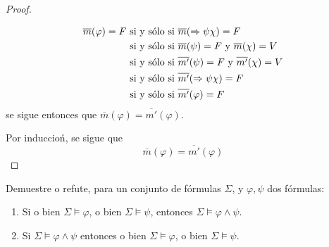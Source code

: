 \documentclass[12pt]{report}
\theoremstyle{largebreak}
\begin{document}
\begin{proof}
\begin{itemize}
\begin{itemize}
                \begin{equation*}
                    \begin{split}
                        \overline{m}(\varphi)=F&\textup{ si y sólo si }\overline{m}(\Rightarrow\psi\chi)=F\\
                        &\textup{ si y sólo si }\overline{m}(\psi)=F\textup{ y }\overline{m}(\chi)=V\\
                        &\textup{ si y sólo si }\overline{m'}(\psi)=F\textup{ y }\overline{m'}(\chi)=V\\
                        &\textup{ si y sólo si }\overline{m'}(\Rightarrow\psi\chi)=F\\
                        &\textup{ si y sólo si }\overline{m'}(\varphi)=F\\
                    \end{split}
                \end{equation*}
                se sigue entonces que $\overline{m}(\varphi)=\overline{m'}(\varphi)$.
            \end{itemize}
        \end{itemize}
        Por induccioń, se sigue que
        \begin{equation*}
            \overline{m}(\varphi)=\overline{m'}(\varphi)
        \end{equation*}
    \end{proof}

    \begin{excer}
        Demuestre o refute, para un conjunto de fórmulas $\Sigma$, y $\varphi,\psi$ dos fórmulas:
        \begin{enumerate}
            \item Si o bien $\Sigma\vDash\varphi$, o bien $\Sigma\vDash\psi$, entonces $\Sigma\vDash\varphi\land\psi$.
            \item Si $\Sigma\vDash\varphi\land\psi$ entonces o bien $\Sigma\vDash\varphi$, o bien $\Sigma\vDash\psi$.
        \end{enumerate}
    \end{excer}
    
\end{document}
